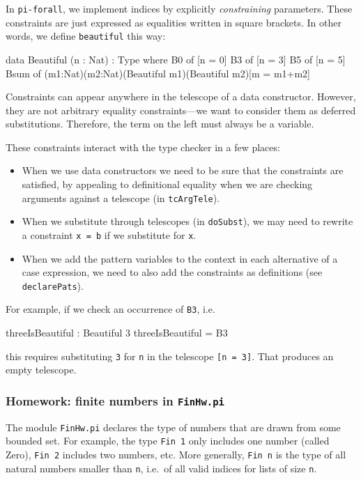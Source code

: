 \documentclass{article}
\newcommand\pif{\texttt{pi-forall}\xspace}
\theoremstyle{definition}
\begin{document}
In \pif, we implement indices by explicitly \emph{constraining}
parameters. These constraints are just expressed as equalities written in
square brackets. In other words, we define \texttt{beautiful} this way:

\begin{piforall}
data Beautiful (n : Nat) : Type where
  B0 of [n = 0]
  B3 of [n = 3]
  B5 of [n = 5]
  Bsum of (m1:Nat)(m2:Nat)(Beautiful m1)(Beautiful m2)[m = m1+m2]
\end{piforall}

Constraints can appear anywhere in the telescope of a data constructor.
However, they are not arbitrary equality constraints---we want to
consider them as deferred substitutions. Therefore, the term on the
left must always be a variable.

These constraints interact with the type checker in a few places:

\begin{itemize}
\item
  When we use data constructors we need to be sure that the constraints
  are satisfied, by appealing to definitional equality when we are
  checking arguments against a telescope (in \texttt{tcArgTele}).


\item
  When we substitute through telescopes (in \texttt{doSubst}), we may
  need to rewrite a constraint \texttt{x\ =\ b} if we substitute for
  \texttt{x}.

\item
  When we add the pattern variables to the context in each alternative
  of a case expression, we need to also add the constraints as
  definitions (see \texttt{declarePats}).
\end{itemize}

For example, if we check an occurrence of \texttt{B3}, i.e.~
%
\begin{piforall}
threeIsBeautiful : Beautiful 3
threeIsBeautiful = B3
\end{piforall}
%
this requires substituting \texttt{3} for \texttt{n} in the telescope
\texttt{{[}n\ =\ 3{]}}. That produces an empty telescope.

\subsubsection{Homework: finite numbers in \texttt{FinHw.pi}}

The module \texttt{FinHw.pi} declares the type of numbers that are drawn
from some bounded set. For example, the type \texttt{Fin\ 1} only
includes one number (called Zero), \texttt{Fin\ 2} includes two numbers,
etc. More generally, \texttt{Fin\ n} is the type of all natural numbers
smaller than \texttt{n}, i.e.~of all valid indices for lists of size
\texttt{n}.
\end{document}
